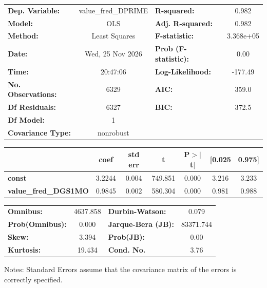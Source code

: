 \begin{center}
\begin{tabular}{lclc}
\toprule
\textbf{Dep. Variable:}      & value\_fred\_DPRIME & \textbf{  R-squared:         } &     0.982   \\
\textbf{Model:}              &         OLS         & \textbf{  Adj. R-squared:    } &     0.982   \\
\textbf{Method:}             &    Least Squares    & \textbf{  F-statistic:       } & 3.368e+05   \\
\textbf{Date:}               &   Wed, 25 Nov 2026  & \textbf{  Prob (F-statistic):} &     0.00    \\
\textbf{Time:}               &       20:47:06      & \textbf{  Log-Likelihood:    } &   -177.49   \\
\textbf{No. Observations:}   &          6329       & \textbf{  AIC:               } &     359.0   \\
\textbf{Df Residuals:}       &          6327       & \textbf{  BIC:               } &     372.5   \\
\textbf{Df Model:}           &             1       & \textbf{                     } &             \\
\textbf{Covariance Type:}    &      nonrobust      & \textbf{                     } &             \\
\bottomrule
\end{tabular}
\begin{tabular}{lcccccc}
                             & \textbf{coef} & \textbf{std err} & \textbf{t} & \textbf{P$> |$t$|$} & \textbf{[0.025} & \textbf{0.975]}  \\
\midrule
\textbf{const}               &       3.2244  &        0.004     &   749.851  &         0.000        &        3.216    &        3.233     \\
\textbf{value\_fred\_DGS1MO} &       0.9845  &        0.002     &   580.304  &         0.000        &        0.981    &        0.988     \\
\bottomrule
\end{tabular}
\begin{tabular}{lclc}
\textbf{Omnibus:}       & 4637.858 & \textbf{  Durbin-Watson:     } &     0.079  \\
\textbf{Prob(Omnibus):} &   0.000  & \textbf{  Jarque-Bera (JB):  } & 83371.744  \\
\textbf{Skew:}          &   3.394  & \textbf{  Prob(JB):          } &      0.00  \\
\textbf{Kurtosis:}      &  19.434  & \textbf{  Cond. No.          } &      3.76  \\
\bottomrule
\end{tabular}
\end{center}

Notes: \newline
 [1] Standard Errors assume that the covariance matrix of the errors is correctly specified.